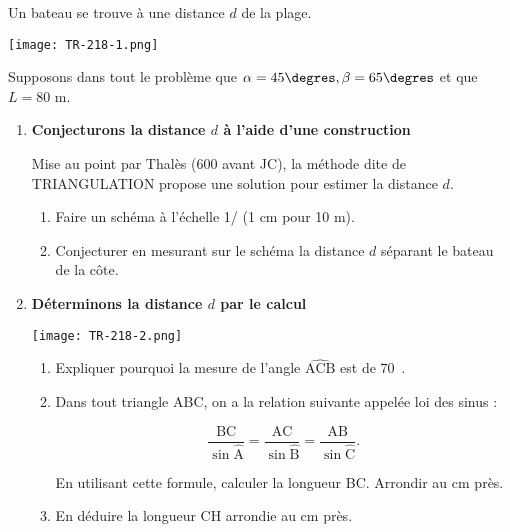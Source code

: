 
Un bateau se trouve à une distance $d$ de la plage.

\begin{center}
\texttt{[image: TR-218-1.png]} 
\end{center}

Supposons dans tout le problème que $\alpha = 45\degres, \beta = 65\degres$ et que $L = 80$ m.

\medskip

\begin{enumerate}
\item \textbf{Conjecturons la distance \boldmath$d$ \unboldmath à l'aide d'une construction}

\medskip

Mise au point par Thalès (600 avant JC), la méthode dite de TRIANGULATION
propose une solution pour estimer la distance $d$.
	\begin{enumerate}
		\item Faire un schéma à l'échelle 1/ (1 cm pour 10 m).
		\item Conjecturer en mesurant sur le schéma la distance $d$ séparant le bateau de la côte.
	\end{enumerate}
\item \textbf{Déterminons la distance \boldmath$d$ \unboldmath par le calcul}

\begin{center}
\texttt{[image: TR-218-2.png]} 
\end{center}

	\begin{enumerate}
		\item Expliquer pourquoi la mesure de l'angle $\widehat{\text{ACB}}$ est de $70$~\degres.
		\item Dans tout triangle ABC, on a la relation suivante appelée \og loi des sinus \fg :
  
\[\dfrac{\text{BC}}{\sin \widehat{\text{A}}} = \dfrac{\text{AC}}{\sin \widehat{\text{B}}} = \dfrac{\text{AB}}{\sin \widehat{\text{C}}}.\]

En utilisant cette formule, calculer la longueur BC. Arrondir au cm près.
		\item En déduire la longueur CH arrondie au cm près.
	\end{enumerate}
\end{enumerate}






